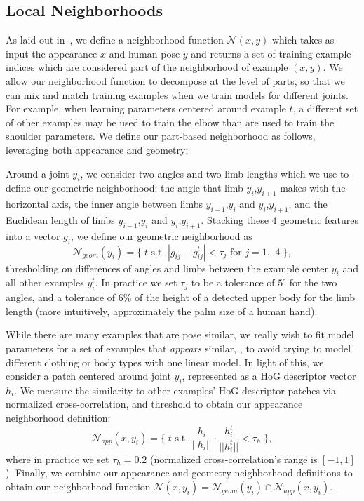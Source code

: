 \subsection{Local Neighborhoods}\label{sec:nbhd}

As laid out in~, we define a neighborhood function 
$\mathcal{N}(x,y)$ which takes as input the appearance $x$ and human pose $y$ 
and returns a set of training example indices which are considered part of the 
neighborhood of example $(x,y)$.  We allow our neighborhood function to 
decompose at the level of parts, so that we can mix and match training examples 
when we train models for different joints.  For example, when learning 
parameters centered around example $t$, a different set of other examples may 
be used to train the elbow than are used to train the shoulder parameters.  We 
define our part-based neighborhood as follows, leveraging both appearance and 
geometry:

 Around a joint $y_i$, 
we consider two angles and two limb lengths which we use to define our 
geometric neighborhood: the angle that limb $y_i$,$y_{i+1}$ makes with the 
horizontal axis, the inner angle between limbs $y_{i-1}$,$y_i$ and 
$y_{i}$,$y_{i+1}$, and the Euclidean length of limbs $y_{i-1}$,$y_i$ and 
$y_{i}$,$y_{i+1}$.  Stacking these $4$ geometric features into a vector $g_i$, 
we define our geometric neighborhood as $$ \mathcal{N}_{geom}(y_i) = \{\; t 
\text{ s.t. } |g_{ij} - g^t_{ij}| < \tau_j \text{ for $j=1...4$}\;\},$$ 
thresholding on differences of angles and limbs between the example center 
$y_i$ and all other examples $y_i^t$.  In practice we set $\tau_j$ to be a 
tolerance of $5^\circ$ for the two angles, and a tolerance of 6\% of the height 
of a detected upper body for the limb length (more intuitively, approximately 
the palm size of a human hand).


  While there are 
many examples that are pose similar, we really wish to fit model parameters for 
a set of examples that {\em appears} similar, \eg, to avoid trying to model
different clothing or body types with one linear model.  In light of this, we 
consider a patch centered around joint $y_i$, represented as a HoG descriptor 
vector $h_i$.  We measure the similarity to other examples' HoG descriptor 
patches via normalized cross-correlation, and threshold to obtain our 
appearance neighborhood definition: $$  \mathcal{N}_{app}(x,y_i) = \{\; t 
\text{ s.t. } \frac{h_i}{||h_i||} \cdot \frac{h_i^t}{||h_i^t||} < \tau_h 
\;\},$$ where in practice we set $\tau_h = 0.2$ (normalized cross-correlation's 
range is $[-1,1]$).
Finally, we combine our appearance and geometry neighborhood definitions to 
obtain our neighborhood function $\mathcal{N}(x,y_i) = \mathcal{N}_{geom}(y_i) 
\cap \mathcal{N}_{app}(x,y_i).$

